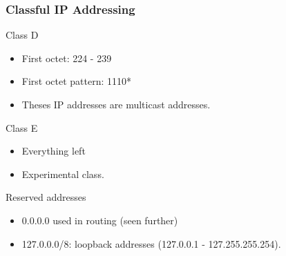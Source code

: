   \begin{frame}
    \frametitle{Classful IP Addressing}
    \begin{block}{Class D}
      \begin{itemize}
	\item First octet: 224 - 239 \pause
	\item First octet pattern: 1110* \pause
	\item Theses IP addresses are multicast addresses.\pause
      \end{itemize}
    \end{block}
    \begin{block}{Class E}
      \begin{itemize}
	\item Everything left \pause
	\item Experimental class.
      \end{itemize}
    \end{block}
  \end{frame}
  \begin{frame}
    \begin{block}{Reserved addresses}
      \begin{itemize}
	\item 0.0.0.0 used in routing (seen further) \pause
	\item 127.0.0.0/8: loopback addresses (127.0.0.1 - 127.255.255.254).
      \end{itemize}
    \end{block}
  \end{frame}
